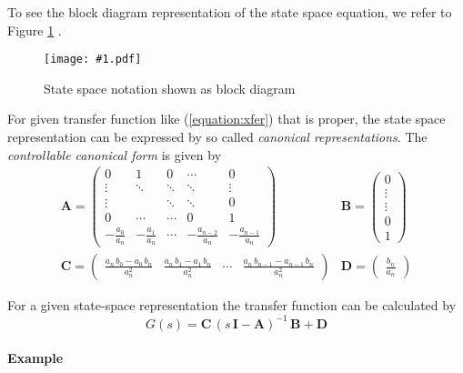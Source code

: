 \documentclass[a4paper,12pt]{article}
\newcommand{\Fig}[3]{%
	\begin{figure}[htb]%
	\begin{center}%
	\texttt{[image: \#1.pdf]}%
	\end{center}%
	\caption{#3\label{fig:#1}}%
	\end{figure}%
	}
\newcommand{\FigRef}[1]{%
	Figure \ref{fig:#1}%
	}
\newcommand{\Mat}[1]{\mathbf{#1}}
\newcommand{\ERef}[1]{(\ref{equation:#1})}
\begin{document}
To see the block diagram representation of the state space equation, we refer
to \FigRef{statespace}.\\

\Fig{statespace}{0.8}{State space notation shown as block diagram}

For given transfer function like \ERef{xfer} that is proper, the state space
representation can be expressed by so called {\em canonical representations}.
The {\em controllable canonical form} is given by
\begin{equation}
\begin{array}{ll}
\Mat{A}=\left(\begin{array}{ccccc}
0 & 1 & 0 & \cdots & 0\\
\vdots & \ddots & \ddots & \ddots & \vdots\\
\vdots & & \ddots & \ddots & 0\\
0 & \cdots & \cdots & 0 & 1\\
-\frac{a_0}{a_n} & -\frac{a_1}{a_n} & \cdots & -\frac{a_{n-2}}{a_n} & -\frac{a_{n-1}}{a_n}
\end{array}\right)
&
\Mat{B}=\left(\begin{array}{c}
0\\
\vdots\\
\vdots\\
0\\
1
\end{array}\right)\\
\Mat{C}=\left(\begin{array}{ccccc}
\frac{a_n\,b_0-a_0\,b_n}{a_n^2} & \frac{a_n\,b_1-a_1\,b_n}{a_n^2} & \cdots & \frac{a_n\,b_{n-1}-a_{n-1}\,b_n}{a_n^2}
\end{array}\right)
&
\Mat{D}=\left(\begin{array}{c}
\frac{b_n}{a_n}
\end{array}\right)
\end{array}
\end{equation}

For a given state-space representation the transfer function can be calculated
by
\begin{equation}
G(s)=\Mat{C}\,\left(s\,\Mat{I}-\Mat{A}\right)^{-1}\,\Mat{B}+\Mat{D}
\end{equation}

\paragraph{Example}
\end{document}
